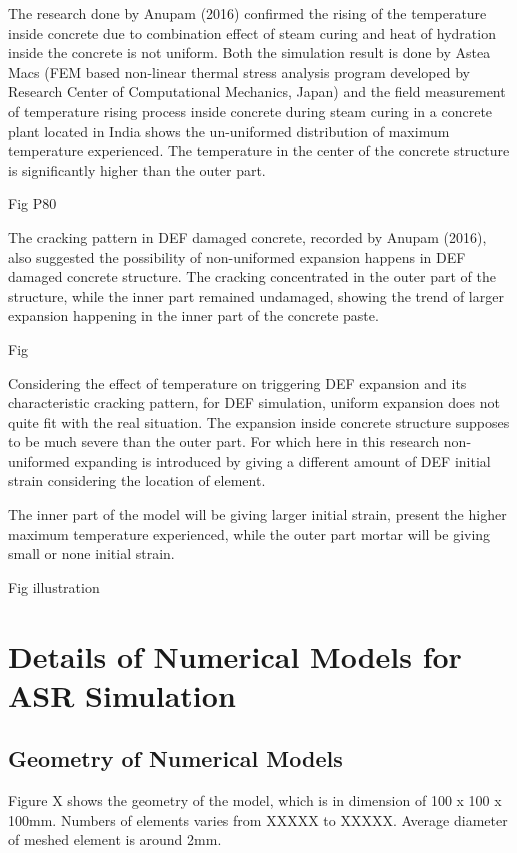 The research done by Anupam (2016) confirmed the rising of the temperature inside concrete due to combination effect of steam curing and heat of hydration inside the concrete is not uniform. Both the simulation result is done by Astea Macs (FEM based non-linear thermal stress analysis program developed by Research Center of Computational Mechanics, Japan) and the field measurement of temperature rising process inside concrete during steam curing in a concrete plant located in India shows the un-uniformed distribution of maximum temperature experienced. The temperature in the center of the concrete structure is significantly higher than the outer part.

Fig P80

The cracking pattern in DEF damaged concrete, recorded by Anupam (2016), also suggested the possibility of non-uniformed expansion happens in DEF damaged concrete structure. The cracking concentrated in the outer part of the structure, while the inner part remained undamaged, showing the trend of larger expansion happening in the inner part of the concrete paste.

Fig

Considering the effect of temperature on triggering  DEF expansion and its characteristic cracking pattern, for DEF simulation, uniform expansion does not quite fit with the real situation. The expansion inside concrete structure supposes to be much severe than the outer part. For which here in this research non-uniformed expanding is introduced by giving a different amount of DEF initial strain considering the location of element.


The inner part of the model will be giving larger initial strain,  present the higher maximum temperature experienced, while the outer part mortar will be giving small or none initial strain.

Fig illustration



\section{Details of Numerical Models for ASR Simulation}

\subsection{Geometry of Numerical Models}

Figure X shows the geometry of the model, which is in dimension of 100 x 100 x 100mm. Numbers of elements varies from XXXXX to XXXXX. Average diameter of meshed element is around 2mm.

